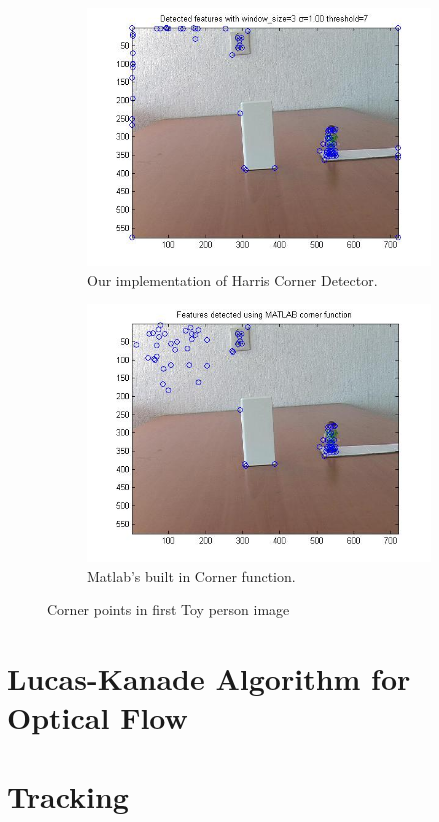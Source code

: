 \documentclass[11pt]{article}
\begin{document}
\begin{figure}[H] \centering
	\begin{subfigure}{.5\textwidth} \centering
		\includegraphics[width=.9\textwidth]{imgs/ourCorners_person.jpg}
		\caption{Our implementation of Harris Corner Detector.}
		\label{fig:ourCorners_person}
	\end{subfigure}%
	\begin{subfigure}{.5\textwidth}	\centering
		\includegraphics[width=.9\textwidth]{imgs/matlabCorners_person.jpg}
		\caption{Matlab's built in Corner function.}
		\label{fig:matlabCorners_person}
	\end{subfigure}
	\caption{Corner points in first Toy person image}
	\label{fig:corners_person}
\end{figure}

\section{Lucas-Kanade Algorithm for Optical Flow}


\section{Tracking}
\end{document}
